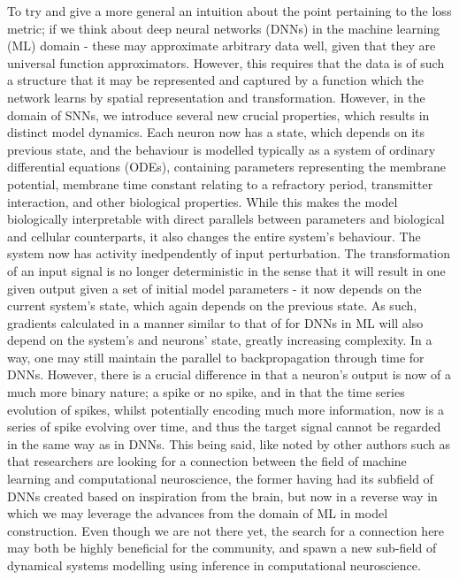 \documentclass[mphil,deptreport,ianc]{infthesis} %
\begin{document}
To try and give a more general an intuition about the point pertaining to the loss metric; if we think about deep neural networks (DNNs) in the machine learning (ML) domain - these may approximate arbitrary data well, given that they are universal function approximators. 
However, this requires that the data is of such a structure that it may be represented and captured by a function which the network learns by spatial representation and transformation.
However, in the domain of SNNs, we introduce several new crucial properties, which results in distinct model dynamics. 
Each neuron now has a state, which depends on its previous state, and the behaviour is modelled typically as a system of ordinary differential equations (ODEs), containing parameters representing the membrane potential, membrane time constant relating to a refractory period, transmitter interaction, and other biological properties. 
While this makes the model biologically interpretable with direct parallels between parameters and biological and cellular counterparts, it also changes the entire system's behaviour.
The system now has activity inedpendently of input perturbation. 
The transformation of an input signal is no longer deterministic in the sense that it will result in one given output given a set of initial model parameters - it now depends on the current system's state, which again depends on the previous state.
As such, gradients calculated in a manner similar to that of for DNNs in ML will also depend on the system's and neurons' state, greatly increasing complexity.
In a way, one may still maintain the parallel to backpropagation through time for DNNs. 
However, there is a crucial difference in that a neuron's output is now of a much more binary nature; a spike or no spike, and in that the time series evolution of spikes, whilst potentially encoding much more information, now is a series of spike evolving over time, and thus the target signal cannot be regarded in the same way as in DNNs.
This being said, like noted by other authors such as \cite{Sindaci2018} that researchers are looking for a connection between the field of machine learning and computational neuroscience, the former having had its subfield of DNNs created based on inspiration from the brain, but now in a reverse way in which we may leverage the advances from the domain of ML in model construction.
Even though we are not there yet, the search for a connection here may both be highly beneficial for the community, and spawn a new sub-field of dynamical systems modelling using inference in computational neuroscience.
\end{document}
